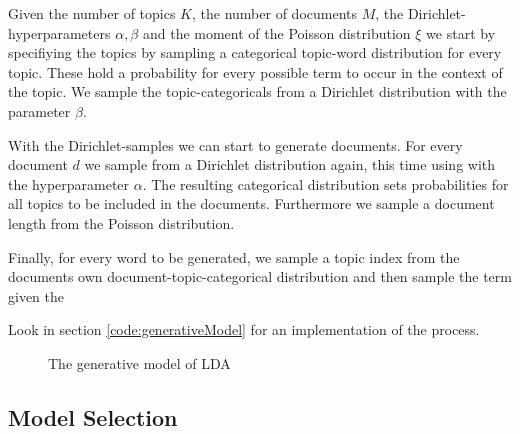 \documentclass[12pt,landscape,twopage]{article}
\begin{document}
Given the number of topics \(K\), the number of documents \(M\), the Dirichlet-hyperparameters \(\alpha,\beta\) and the moment of the Poisson distribution \( \xi \) we start by specifiying the topics by sampling a categorical topic-word distribution for every topic. These hold a probability for every possible term to occur in the context of the topic. We sample the topic-categoricals from a Dirichlet distribution with the parameter \(\beta\).

With the Dirichlet-samples we can start to generate documents. For every document \( d \) we sample from a Dirichlet distribution again, this time using with the hyperparameter \( \alpha \). The resulting categorical distribution sets probabilities for all topics to be included in the documents. Furthermore we sample a document length from the Poisson distribution.

Finally, for every word to be generated, we sample a topic index from the documents own document-topic-categorical distribution and then sample the term given the

Look in section \ref{code:generativeModel} for an implementation of the process.
\onecolumn
\begin{figure}[h]
 \begin{center}
  \begin{algorithm}[H]
   
  \end{algorithm}
  \caption{The generative model of LDA  \cite{Blei2003,Heinrich2005}}\label{fig:generativeProcess}
 \end{center}
\end{figure}
\subsection{Model Selection}
\end{document}
